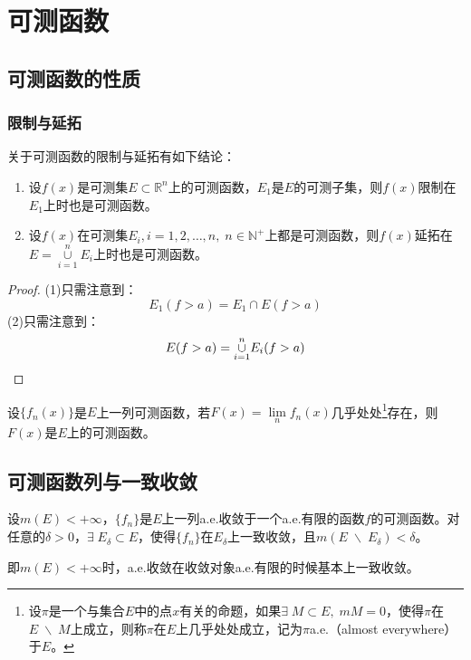 \section{可测函数}

\subsection{可测函数的性质}
\subsubsection{限制与延拓}
\begin{theorem}
	关于可测函数的限制与延拓有如下结论：
	\begin{enumerate}
		\item 设$f(x)$是可测集$E\subset\mathbb{R}^n$上的可测函数，$E_1$是$E$的可测子集，则$f(x)$限制在$E_1$上时也是可测函数。
		\item 设$f(x)$在可测集$E_i,i=1,2,\dots,n,\;n\in\mathbb{N}^+$上都是可测函数，则$f(x)$延拓在$E=\underset{i=1}{\overset{n}{\cup}}E_i$上时也是可测函数。
	\end{enumerate}
\end{theorem}
\begin{proof}
	(1)只需注意到：
	\begin{equation*}
		E_1(f>a)=E_1\cap E(f>a)
	\end{equation*}
	(2)只需注意到：
	\begin{equation*}
		E(f>a)=\underset{i=1}{\overset{n}{\cup}}E_i(f>a)\qedhere
	\end{equation*}
\end{proof}

\begin{corollary}
	设$\{f_n(x)\}$是$E$上一列可测函数，若$F(x)=\lim\limits_nf_n(x)$几乎处处\footnote{设$\pi$是一个与集合$E$中的点$x$有关的命题，如果$\exists\;M\subset E,\;mM=0$，使得$\pi$在$E\;\backslash\;M$上成立，则称$\pi$在$E$上几乎处处成立，记为$\pi$a.e.（almost everywhere）于$E$。}存在，则$F(x)$是$E$上的可测函数。
\end{corollary}



\subsection{可测函数列与一致收敛}
\begin{theorem}[叶戈罗夫定理]
	设$m(E)<+\infty$，$\{f_n\}$是$E$上一列a.e.收敛于一个a.e.有限的函数$f$的可测函数。对任意的$\delta>0$，$\exists\;E_\delta\subset E$，使得$\{f_n\}$在$E_\delta$上一致收敛，且$m(E\;\backslash\;E_\delta)<\delta$。
\end{theorem}
即$m(E)<+\infty$时，a.e.收敛在收敛对象a.e.有限的时候基本上一致收敛。

